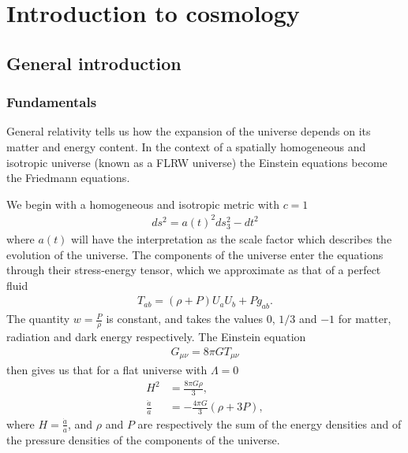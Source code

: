 %
\chapter{Introduction to cosmology}\label{chapter:intro_general}
\section{General introduction}\label{sec:general_intro}
    \subsection{Fundamentals}
    General relativity tells us how the expansion of the universe depends
    on its matter and energy content.
    In the context of a spatially homogeneous and isotropic universe
    (known as a FLRW universe)
    the Einstein equations become the Friedmann equations.


    We begin with a homogeneous and isotropic metric with $c=1$
    \begin{align}
        ds^2 = a(t)^2 ds_3^2 - dt^2
    \end{align}
    where $a(t)$ will have the interpretation as the scale factor
    which describes the evolution of the universe.
    The components of the universe enter the equations through
    their stress-energy tensor, which we approximate as that of
    a perfect fluid
    \begin{align}
        T_{ab} = (\rho+P)U_aU_b+Pg_{ab}.
    \end{align}
    The quantity $w=\frac{P}{\rho}$ is constant,
    and takes the values $0$, $1/3$ and $-1$ for matter, radiation
    and dark energy respectively.
    The Einstein equation
    \begin{align}
        G_{\mu\nu} = 8\pi G T_{\mu\nu}
    \end{align}
    then gives us that
    for a flat universe with $\Lambda=0$
    \begin{align}
        H^2 &= \frac{8\pi G \rho}{3},\\
        \frac{\ddot{a}}{a} &= -\frac{4\pi G}{3}\left(\rho+3P\right),
    \end{align}
    where $H=\frac{\dot{a}}{a}$, and $\rho$ and $P$ are respectively the sum of the
    energy densities and of the pressure densities of the
    components of the universe.

